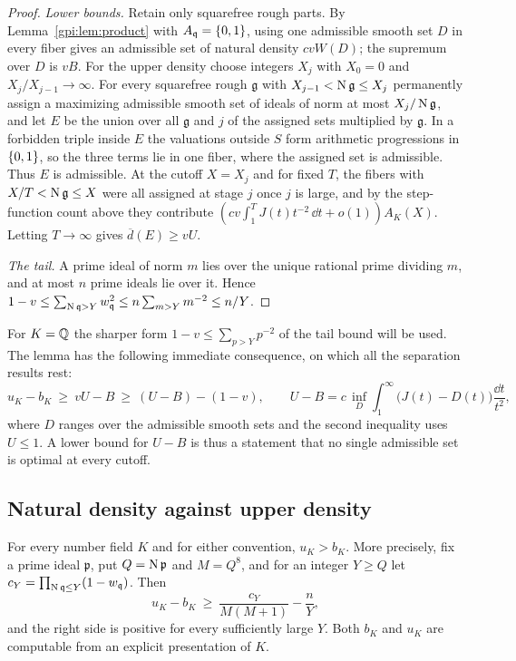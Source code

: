 \begin{proof}
\emph{Lower bounds.} Retain only squarefree rough parts. By Lemma~\ref{gpi:lem:product} with
$A_{\mathfrak q}=\{0,1\}$, using one admissible smooth set $D$ in every fiber gives an
admissible set of natural density $cvW(D)$; the supremum over $D$ is $vB$. For the upper
density choose integers $X_j$ with $X_0=0$ and $X_j/X_{j-1}\to\infty$. For every squarefree
rough $\mathfrak g$ with $X_{j-1}<\operatorname{N}\mathfrak g\le X_j$ permanently assign a maximizing
admissible smooth set of ideals of norm at most $X_j/\operatorname{N}\mathfrak g$, and let $E$ be the union
over all $\mathfrak g$ and $j$ of the assigned sets multiplied by $\mathfrak g$. In a forbidden
triple inside $E$ the valuations outside $S$ form arithmetic progressions in $\{0,1\}$, so
the three terms lie in one fiber, where the assigned set is admissible. Thus $E$ is
admissible. At the cutoff $X=X_j$ and for fixed $T$, the fibers with
$X/T<\operatorname{N}\mathfrak g\le X$ were all assigned at stage $j$ once $j$ is large, and by the
step-function count above they contribute $(cv\int_1^TJ(t)t^{-2}\,\dd t+o(1))A_K(X)$. Letting
$T\to\infty$ gives $\overline d(E)\ge vU$.

\emph{The tail.} A prime ideal of norm $m$ lies over the unique rational prime dividing $m$,
and at most $n$ prime ideals lie over it. Hence
$1-v\le\sum_{\operatorname{N}\mathfrak q>Y}w_{\mathfrak q}^2\le n\sum_{m>Y}m^{-2}\le n/Y$.
\end{proof}

For $K=\mathbb{Q}$ the sharper form $1-v\le\sum_{p>Y}p^{-2}$ of the tail bound will be used. The lemma
has the following immediate consequence, on which all the separation results rest:
\begin{equation}\label{gpi:eq:gapframe}
 u_K-b_K\ \ge\ vU-B\ \ge\ (U-B)-(1-v),\qquad
 U-B=c\,\inf_D\int_1^\infty\bigl(J(t)-D(t)\bigr)\frac{\dd t}{t^2},
\end{equation}
where $D$ ranges over the admissible smooth sets and the second inequality uses $U\le1$. A
lower bound for $U-B$ is thus a statement that no single admissible set is optimal at every
cutoff.

\subsection{Natural density against upper density}\label{gpi:sec:gap}
{\raggedright{}}

\begin{theorem}\label{gpi:thm:ideal-separation}
For every number field $K$ and for either convention, $u_K>b_K$. More precisely, fix a prime
ideal $\mathfrak p$, put $Q=\operatorname{N}\mathfrak p$ and $M=Q^8$, and for an integer $Y\ge Q$ let
$c_Y=\prod_{\operatorname{N}\mathfrak q\le Y}(1-w_{\mathfrak q})$. Then
\begin{equation}\label{gpi:eq:ideal-gap}
 u_K-b_K\ \ge\ \frac{c_Y}{M(M+1)}-\frac nY ,
\end{equation}
and the right side is positive for every sufficiently large $Y$. Both $b_K$ and $u_K$ are
computable from an explicit presentation of $K$.
\end{theorem}

